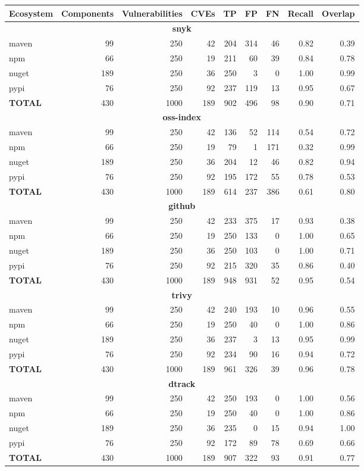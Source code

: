 \begin{table}[!t]
\centering
\small
\begin{tabular}{lrrrrrrrr}
\toprule
Ecosystem & Components & Vulnerabilities & CVEs & TP & FP & FN & Recall & Overlap \\
\midrule
\multicolumn{9}{c}{\textbf{snyk}} \\
\midrule
maven & 99 & 250 & 42 & 204 & 314 & 46 & 0.82 & 0.39 \\
npm & 66 & 250 & 19 & 211 & 60 & 39 & 0.84 & 0.78 \\
nuget & 189 & 250 & 36 & 250 & 3 & 0 & 1.00 & 0.99 \\
pypi & 76 & 250 & 92 & 237 & 119 & 13 & 0.95 & 0.67 \\
\midrule
\textbf{TOTAL} & 430 & 1000 & 189 & 902 & 496 & 98 & 0.90 & 0.71 \\
\midrule
\multicolumn{9}{c}{\textbf{oss-index}} \\
\midrule
maven & 99 & 250 & 42 & 136 & 52 & 114 & 0.54 & 0.72 \\
npm & 66 & 250 & 19 & 79 & 1 & 171 & 0.32 & 0.99 \\
nuget & 189 & 250 & 36 & 204 & 12 & 46 & 0.82 & 0.94 \\
pypi & 76 & 250 & 92 & 195 & 172 & 55 & 0.78 & 0.53 \\
\midrule
\textbf{TOTAL} & 430 & 1000 & 189 & 614 & 237 & 386 & 0.61 & 0.80 \\
\midrule
\multicolumn{9}{c}{\textbf{github}} \\
\midrule
maven & 99 & 250 & 42 & 233 & 375 & 17 & 0.93 & 0.38 \\
npm & 66 & 250 & 19 & 250 & 133 & 0 & 1.00 & 0.65 \\
nuget & 189 & 250 & 36 & 250 & 103 & 0 & 1.00 & 0.71 \\
pypi & 76 & 250 & 92 & 215 & 320 & 35 & 0.86 & 0.40 \\
\midrule
\textbf{TOTAL} & 430 & 1000 & 189 & 948 & 931 & 52 & 0.95 & 0.54 \\
\midrule
\multicolumn{9}{c}{\textbf{trivy}} \\
\midrule
maven & 99 & 250 & 42 & 240 & 193 & 10 & 0.96 & 0.55 \\
npm & 66 & 250 & 19 & 250 & 40 & 0 & 1.00 & 0.86 \\
nuget & 189 & 250 & 36 & 237 & 3 & 13 & 0.95 & 0.99 \\
pypi & 76 & 250 & 92 & 234 & 90 & 16 & 0.94 & 0.72 \\
\midrule
\textbf{TOTAL} & 430 & 1000 & 189 & 961 & 326 & 39 & 0.96 & 0.78 \\
\midrule
\multicolumn{9}{c}{\textbf{dtrack}} \\
\midrule
maven & 99 & 250 & 42 & 250 & 193 & 0 & 1.00 & 0.56 \\
npm & 66 & 250 & 19 & 250 & 40 & 0 & 1.00 & 0.86 \\
nuget & 189 & 250 & 36 & 235 & 0 & 15 & 0.94 & 1.00 \\
pypi & 76 & 250 & 92 & 172 & 89 & 78 & 0.69 & 0.66 \\
\midrule
\textbf{TOTAL} & 430 & 1000 & 189 & 907 & 322 & 93 & 0.91 & 0.77 \\
\midrule
\bottomrule
\end{tabular}
\end{table}
